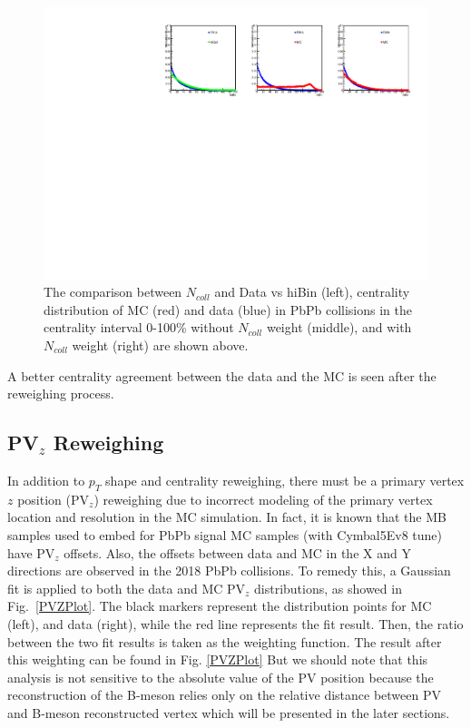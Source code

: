 \begin{figure}[hbtp]
\begin{center}
\includegraphics[width=1.10\textwidth]{Figures/Chapter5/CentralityWeight.pdf}
\caption{The comparison between $N_{coll}$ and Data vs hiBin (left), centrality distribution of MC (red) and data (blue) in PbPb collisions in the centrality interval 0-100\% without $N_{coll}$ weight (middle), and with $N_{coll}$ weight (right) are shown above.}
\label{CentComp}
\end{center}
\end{figure} 


A better centrality agreement between the data and the MC is seen after the reweighing process. 

\subsection{PV$_{z}$ Reweighing}


In addition to $p_T$ shape and centrality reweighing, there must be a primary vertex $z$ position (PV$_{z}$) reweighing due to incorrect modeling of the primary vertex location and resolution in the MC simulation. In fact, it is known that the MB samples used to embed for PbPb signal MC samples (with Cymbal5Ev8 tune) have PV$_{z}$ offsets. Also, the offsets between data and MC in the X and Y directions are observed in the 2018 PbPb collisions. To remedy this, a Gaussian fit is applied to both the data and MC PV$_{z}$ distributions, as showed in Fig.~\ref{PVZPlot}. The black markers represent the distribution points for MC (left), and data (right), while the red line represents the fit result. Then, the ratio between the two fit results is taken as the weighting function. The result after this weighting can be found in Fig. \ref{PVZPlot} But we should note that this analysis is not sensitive to the absolute value of the PV position because the reconstruction of the B-meson relies only on the relative distance between PV and B-meson reconstructed vertex which will be presented in the later sections.

